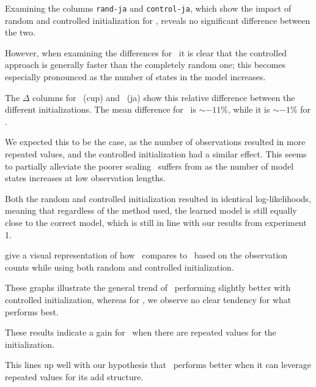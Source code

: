 Examining the columns \texttt{rand-ja} and \texttt{control-ja}, which show the impact of random and controlled initialization for \Jajapy, reveals no significant difference between the two.

However, when examining the differences for \Cupaal\, it is clear that the controlled approach is generally faster than the completely random one; this becomes especially pronounced as the number of states in the model increases.

The $\Delta$ columns for \Cupaal\ (cup) and \Jajapy\ (ja) show this relative difference between the different initializations. The mean difference for \Cupaal\ is $\sim-11\%$, while it is $\sim-1\%$ for \Jajapy.

We expected this to be the case, as the number of observations resulted in more repeated values, and the controlled initialization had a similar effect.
This seems to partially alleviate the poorer scaling \Cupaal\ suffers from as the number of model states increases at low observation lengths.

Both the random and controlled initialization resulted in identical log-likelihoods, meaning that regardless of the method used, the learned model is still equally close to the correct model, which is still in line with our results from experiment 1.

 give a visual representation of how \Cupaal\ compares to \Jajapy\ based on the observation counts while using both random and controlled initialization.

These graphs illustrate the general trend of \Cupaal\ performing slightly better with controlled initialization, whereas for \Jajapy, we observe no clear tendency for what performs best.

These results indicate a gain for \Cupaal\ when there are repeated values for the initialization.

This lines up well with our hypothesis that \Cupaal\ performs better when it can leverage repeated values for its \gls{add} structure.